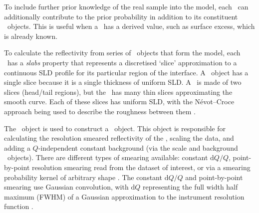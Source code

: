 \documentclass[pdf,preprint]{iucr}
\begin{document}
To include further prior knowledge of the real sample into the model,
each \Component\ can additionally contribute to the prior probability in addition to its constituent \Parameter\ objects. This is useful when a \Component\ has a derived value, such as surface excess, which is already known.

To calculate the reflectivity from series of \Component\ objects that form the model,
each \Component\ has a \emph{slabs} property that represents a discretised `slice' approximation to a continuous SLD profile for its particular region of the interface. A \Slab\ object has a single slice because it is a single thickness of uniform SLD. A \LipidLeaflet\ is made of two slices (head/tail regions), but the \Spline\ has many thin slices approximating the smooth curve. Each of these slices has uniform SLD, with the N\'{e}vot--Croce approach being used to describe the roughness between them \cite{Nevot1980}.

The \Structure\ object is used to construct a \ReflectModel\ object. This object is responsible for calculating the resolution smeared reflectivity of the \Structure, scaling the data, and adding a $Q$-independent constant background (via the scale and background \Parameter\ objects). There are different types of smearing available: constant $\mathrm{d}Q/Q$, point-by-point resolution smearing read from the dataset of interest, or via a smearing probability kernel of arbitrary shape \cite{Nelson2014}. The constant $\mathrm{d}Q/Q$ and point-by-point smearing use Gaussian convolution, with $\mathrm{d}Q$ representing the full width half maximum (FWHM) of a Gaussian approximation to the instrument resolution function \cite{Well2005}.
\end{document}
